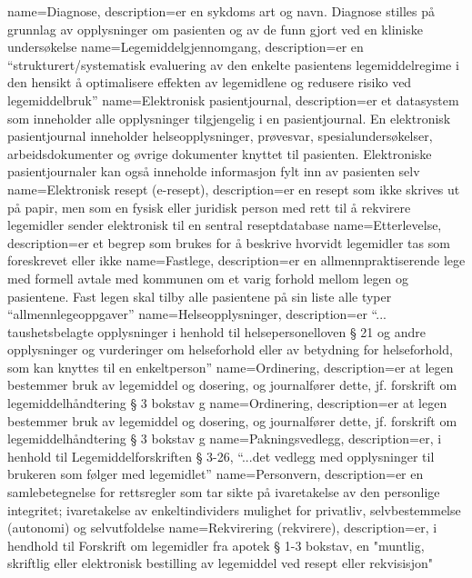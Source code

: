 {
    name=Diagnose,
    description={er en sykdoms art og navn. Diagnose stilles på grunnlag av opplysninger om pasienten og av de funn gjort ved en kliniske undersøkelse} 
}
{
    name=Legemiddelgjennomgang,
    description={er en “strukturert/systematisk evaluering av den enkelte pasientens legemiddelregime i den hensikt å optimalisere effekten av legemidlene og redusere risiko ved legemiddelbruk” \citep{legemiddelgjennomgang}} 
}
{
    name=Elektronisk pasientjournal,
    description={er et datasystem som inneholder alle opplysninger tilgjengelig i en pasientjournal. En elektronisk pasientjournal inneholder helseopplysninger, prøvesvar, spesialundersøkelser, arbeidsdokumenter og øvrige dokumenter knyttet til pasienten. Elektroniske pasientjournaler kan også inneholde informasjon fylt inn av pasienten selv} 
}
{
    name=Elektronisk resept (e-resept),
    description={er en resept som ikke skrives ut på papir, men som en fysisk eller juridisk person med rett til å rekvirere legemidler sender elektronisk til en sentral reseptdatabase} 
}
{
    name=Etterlevelse,
    description={er et begrep som brukes for å beskrive hvorvidt legemidler tas som foreskrevet eller ikke } 
}
{
    name=Fastlege,
    description={er en allmennpraktiserende lege med formell avtale med kommunen om et varig forhold mellom legen og pasientene. Fast legen skal tilby alle pasientene på sin liste alle typer “allmennlegeoppgaver”}
}
{
    name=Helseopplysninger,
    description={er “... taushetsbelagte opplysninger i henhold til helsepersonelloven § 21 og andre opplysninger og vurderinger om helseforhold eller av betydning for helseforhold, som kan knyttes til en enkeltperson”}
}
{
    name=Ordinering,
    description={er at legen bestemmer bruk av legemiddel og dosering, og journalfører dette, jf. forskrift om legemiddelhåndtering § 3 bokstav g}
}
{
    name=Ordinering,
    description={er at legen bestemmer bruk av legemiddel og dosering, og journalfører dette, jf. forskrift om legemiddelhåndtering § 3 bokstav g}
}
{
    name=Pakningsvedlegg,
    description={er, i henhold til Legemiddelforskriften § 3-26, “...det vedlegg med opplysninger til brukeren som følger med legemidlet”}
}
{
    name=Personvern,
    description={er en samlebetegnelse for rettsregler som tar sikte på ivaretakelse av den personlige integritet; ivaretakelse
av enkeltindividers mulighet for privatliv, selvbestemmelse (autonomi) og selvutfoldelse}
}
{
    name=Rekvirering (rekvirere),
    description={er, i hendhold til Forskrift om legemidler fra apotek § 1-3 bokstav, en "muntlig, skriftlig eller elektronisk bestilling av legemiddel ved resept eller rekvisisjon"}
}







 
 




